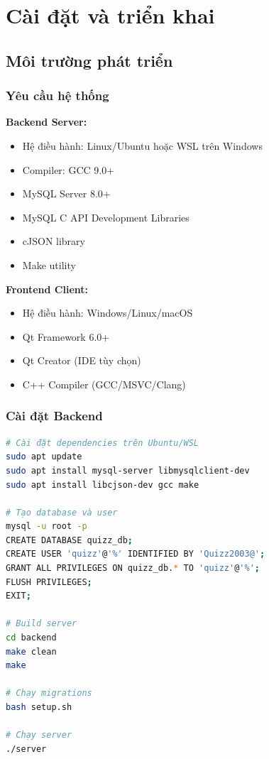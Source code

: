 ﻿\documentclass[12pt,a4paper]{report}
\begin{document}
\chapter{Cài đặt và triển khai}

\section{Môi trường phát triển}

\subsection{Yêu cầu hệ thống}

\textbf{Backend Server:}
\begin{itemize}
    \item Hệ điều hành: Linux/Ubuntu hoặc WSL trên Windows
    \item Compiler: GCC 9.0+
    \item MySQL Server 8.0+
    \item MySQL C API Development Libraries
    \item cJSON library
    \item Make utility
\end{itemize}

\textbf{Frontend Client:}
\begin{itemize}
    \item Hệ điều hành: Windows/Linux/macOS
    \item Qt Framework 6.0+
    \item Qt Creator (IDE tùy chọn)
    \item C++ Compiler (GCC/MSVC/Clang)
\end{itemize}

\subsection{Cài đặt Backend}

\begin{lstlisting}[language=bash]
# Cài đặt dependencies trên Ubuntu/WSL
sudo apt update
sudo apt install mysql-server libmysqlclient-dev
sudo apt install libcjson-dev gcc make

# Tạo database và user
mysql -u root -p
CREATE DATABASE quizz_db;
CREATE USER 'quizz'@'%' IDENTIFIED BY 'Quizz2003@';
GRANT ALL PRIVILEGES ON quizz_db.* TO 'quizz'@'%';
FLUSH PRIVILEGES;
EXIT;

# Build server
cd backend
make clean
make

# Chạy migrations
bash setup.sh

# Chạy server
./server
\end{lstlisting}
\end{document}
